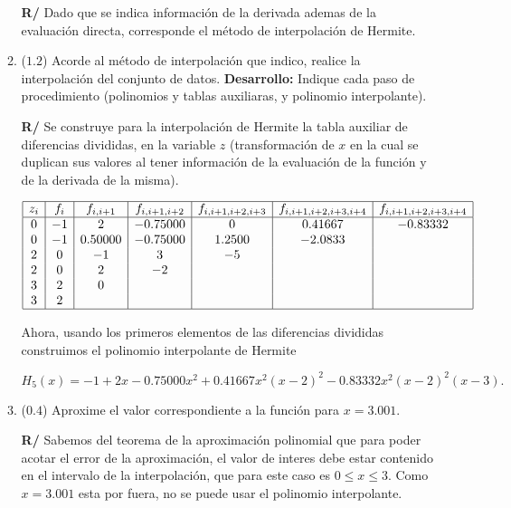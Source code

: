 \documentclass[12pt]{article}
\begin{document}
\begin{enumerate}[leftmargin=*,widest=9]
\begin{enumerate}[label=\alph*]
  \textbf{R/} Dado que se indica información de la derivada ademas de la evaluación directa, corresponde el método de interpolación de Hermite.
  
   \item (\(1.2\)) Acorde al método de interpolación que indico, realice la interpolación del conjunto de datos. \textbf{Desarrollo:} Indique cada paso de procedimiento (polinomios y tablas auxiliaras, y polinomio interpolante).
   
   
\textbf{R/} Se construye para la interpolación de Hermite la tabla auxiliar de diferencias divididas, en la variable \(z\) (transformación de \(x\) en la cual se duplican sus valores al tener información de la evaluación de la función y de la derivada de la misma).

\begin{equation*}
\begin{array}{|c|c|c|c|c|c|c|}
\hline
z_i & f_i & f_{i, i+1} & f_{i, i+1, i+2} & f_{i, i+1, i+2, i+3}& f_{i, i+1, i+2, i+3, i+4} & f_{i, i+1, i+2, i+3, i+4}\\
\hline
0 & -1 & 2       & -0.75000 & 0       & 0.41667 & -0.83332\\
0 & -1 & 0.50000 & -0.75000 & 1.2500  & -2.0833 &\\
2 & 0  & -1      & 3   & -5 &&\\
2 & 0  & 2  & -2  &&&\\
3 & 2  & 0       &&&&\\
3 & 2  &&&&&\\
\hline
\end{array}
\end{equation*}

Ahora, usando los primeros elementos de las diferencias divididas construimos el polinomio interpolante de Hermite

\[H_5(x) =-1 + 2x -0.75000x^2 + 0.41667x^2(x-2)^2-0.83332 x^2(x-2)^2(x-3). \] 

\item (\(0.4\)) Aproxime el valor correspondiente a la función para \(x=3.001\). 
   
   \textbf{R/} Sabemos del teorema de la aproximación polinomial que para poder acotar el error de la aproximación, el valor de interes debe estar contenido en el intervalo de la interpolación, que para este caso es \(0 \leq x \leq 3\). Como \(x=3.001\) esta por fuera, no se puede usar el polinomio interpolante.
   \end{enumerate}
  \end{enumerate}
\end{document}

